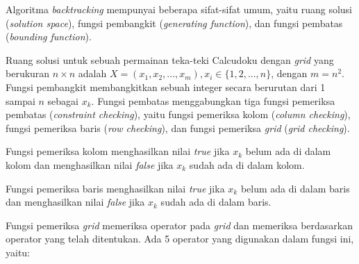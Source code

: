 \documentclass[a4paper,twoside]{article}
\begin{document}
\begin{enumerate}
Algoritma \textit{backtracking} mempunyai beberapa sifat-sifat umum, yaitu ruang solusi (\textit{solution space}), fungsi pembangkit (\textit{generating function}), dan fungsi pembatas (\textit{bounding function}).

Ruang solusi untuk sebuah permainan teka-teki Calcudoku dengan \textit{grid} yang berukuran \begin{math}n \times n\end{math} adalah \begin{math}X = (x_1,x_2,...,x_m), x_i \in \{1,2,...,n\}\end{math}, dengan \begin{math}m = n^2\end{math}. Fungsi pembangkit membangkitkan sebuah integer secara berurutan dari 1 sampai \begin{math}n\end{math} sebagai \begin{math}x_k\end{math}. Fungsi pembatas menggabungkan tiga fungsi pemeriksa pembatas (\textit{constraint checking}), yaitu fungsi pemeriksa kolom (\textit{column checking}), fungsi pemeriksa baris (\textit{row checking}), dan fungsi pemeriksa \textit{grid} (\textit{grid checking}).

Fungsi pemeriksa kolom menghasilkan nilai \textit{true} jika \begin{math}x_k\end{math} belum ada di dalam kolom dan menghasilkan nilai \textit{false} jika \begin{math}x_k\end{math} sudah ada di dalam kolom.

Fungsi pemeriksa baris menghasilkan nilai \textit{true} jika \begin{math}x_k\end{math} belum ada di dalam baris dan menghasilkan nilai \textit{false} jika \begin{math}x_k\end{math} sudah ada di dalam baris.

Fungsi pemeriksa \textit{grid} memeriksa operator pada \textit{grid} dan memeriksa berdasarkan operator yang telah ditentukan. Ada 5 operator yang digunakan dalam fungsi ini, yaitu:


\end{enumerate}
\end{document}
